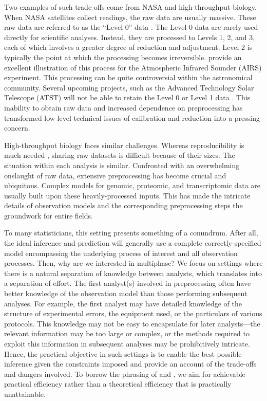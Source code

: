 Two examples of such trade-offs come from NASA and high-throughput biology.
When NASA satellites collect readings, the raw data are usually massive.
These raw data are referred to as the ``Level 0'' data \citep{ChandraSDP}.
The Level 0 data are rarely used directly for scientific analyses.
Instead, they are processed to Levels 1, 2, and 3, each of which involves a greater degree of reduction and adjustment.
Level 2 is typically the point at which the processing becomes irreversible.
\cite{Braverman2012} provide an excellent illustration of this process for the Atmospheric Infrared Sounder (AIRS) experiment.
This processing can be quite controversial within the astronomical community.
Several upcoming projects, such as the Advanced Technology Solar Telescope (ATST) will not be able to retain the Level 0 or Level 1 data \citep{Davey2012}.
This inability to obtain raw data and increased dependence on preprocessing has transformed low-level technical issues of calibration and reduction into a pressing concern.

High-throughput biology faces similar challenges.
Whereas reproducibility is much needed \citep[e.g.,][]{Ioannidis2011}, sharing raw datasets is difficult because of their sizes.
The situation within each analysis is similar.
Confronted with an overwhelming onslaught of raw data, extensive preprocessing has become crucial and ubiquitous.
Complex models for genomic, proteomic, and transcriptomic data are usually built upon these heavily-processed inputs.
This has made the intricate details of observation models and the corresponding preprocessing steps the groundwork for entire fields.

To many statisticians, this setting presents something of a conundrum.
After all, the ideal inference and prediction will generally use a complete correctly-specified model encompassing the underlying process of interest and all observation processes.
Then, why are we interested in multiphase?
We focus on settings where there is a natural separation of knowledge between analysts, which translates into a separation of effort.
The first analyst(s) involved in preprocessing often have better knowledge of the observation model than those performing subsequent analyses.
For example, the first analyst may have detailed knowledge of the structure of experimental errors, the equipment used, or the particulars of various protocols.
This knowledge may not be easy to encapsulate for later analysts---the relevant information may be too large or complex, or the methods required to exploit this information in subsequent analyses may be prohibitively intricate.
%
%
Hence, the practical objective in such settings is to enable the best possible inference given the constraints imposed and provide an account of the trade-offs and dangers involved.
To borrow the phrasing of \citet{Meng2003} and \citet{Rubin1996}, we aim for achievable practical efficiency rather than a theoretical efficiency that is practically unattainable.

